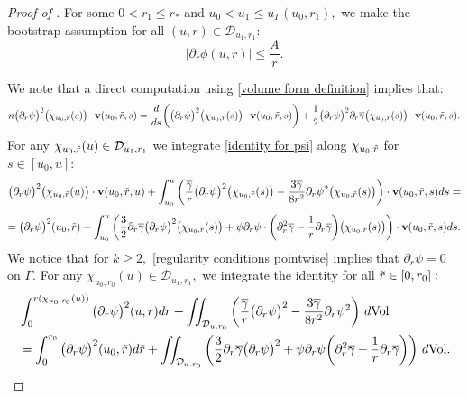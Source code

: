 \documentclass[11pt]{article}
\numberwithin{equation}{section}
\begin{document}
\begin{proof}[Proof of ]
    For some $0<r_1\leq r_*$ and $u_0<u_1\leq u_{\Gamma}(u_0,r_1),$ we make the bootstrap assumption for all $(u,r)\in\mathcal{D}_{u_1,r_1}$:
    \begin{equation}\label{bootstrap assumption preliminary mass gap}
        \big|\partial_r\phi(u,r)\big|\leq\frac{A}{r}.
    \end{equation}
    
    
    We note that a direct computation using \eqref{volume form definition} implies that:
    \[n\big(\partial_r\psi\big)^2\big(\chi_{u_0,\Tilde{r}}(s)\big)\cdot \textbf{v}(u_0,\Tilde{r},s)=\frac{d}{ds}\bigg(\big(\partial_r\psi\big)^2\big(\chi_{u_0,\Tilde{r}}(s)\big)\cdot \textbf{v}(u_0,\Tilde{r},s)\bigg)+\frac{1}{2}\big(\partial_r\psi\big)^2\partial_r\overline{\gamma}\big(\chi_{u_0,\Tilde{r}}(s)\big)\cdot \textbf{v}(u_0,\Tilde{r},s).\]
    For any $\chi_{u_0,\Tilde{r}}(u)\in\mathcal{D}_{u_1,r_1}$ we integrate \eqref{identity for psi} along $\chi_{u_0,\Tilde{r}}$ for $s\in[u_0,u]:$
    \[\big(\partial_r\psi\big)^2\big(\chi_{u_0,\Tilde{r}}(u)\big)\cdot \textbf{v}(u_0,\Tilde{r},u)+\int_{u_0}^u\bigg(\frac{\overline{\gamma}}{r}\big(\partial_r\psi\big)^2\big(\chi_{u_0,\Tilde{r}}(s)\big)-\frac{3\overline{\gamma}}{8r^2}\partial_r\psi^2\big(\chi_{u_0,\Tilde{r}}(s)\big)\bigg)\cdot \textbf{v}(u_0,\Tilde{r},s)ds=\]\[=\big(\partial_r\psi\big)^2(u_0,\Tilde{r})+\int_{u_0}^u\bigg(\frac{3}{2}\partial_r\overline{\gamma}\big(\partial_r\psi\big)^2\big(\chi_{u_0,\Tilde{r}}(s)\big)+\psi\partial_r\psi\cdot\bigg(\partial_r^2\overline{\gamma}-\frac{1}{r}\partial_r\overline{\gamma}\bigg)\big(\chi_{u_0,\Tilde{r}}(s)\big)\bigg)\cdot \textbf{v}(u_0,\Tilde{r},s)ds.\]
    We notice that for $k\geq2,$ \eqref{regularity conditions pointwise} implies that $\partial_r\psi=0$ on $\Gamma.$ For any $\chi_{u_0,r_0}(u)\in\mathcal{D}_{u_1,r_1},$ we integrate the identity for all $\Tilde{r}\in[0,r_0]:$
    \begin{align}\label{energy identity preliminary}
        &\int_0^{r(\chi_{u_0,r_0}(u))}\big(\partial_r\psi\big)^2(u,r)dr+\iint_{\mathcal{D}_{u,r_0}}\bigg(\frac{\overline{\gamma}}{r}\big(\partial_r\psi\big)^2-\frac{3\overline{\gamma}}{8r^2}\partial_r\psi^2\bigg)\ d\mathrm{Vol}\\
        &=\int_0^{r_0}\big(\partial_r\psi\big)^2(u_0,\Tilde{r})d\Tilde{r}+\iint_{\mathcal{D}_{u,r_0}}\bigg(\frac{3}{2}\partial_r\overline{\gamma}\big(\partial_r\psi\big)^2+\psi\partial_r\psi\bigg(\partial_r^2\overline{\gamma}-\frac{1}{r}\partial_r\overline{\gamma}\bigg)\bigg)\ d\mathrm{Vol}.\notag

\end{align}
\end{proof}
\end{document}
